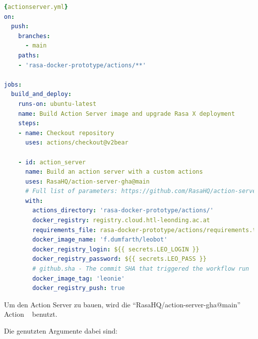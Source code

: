 \begin{lstlisting}[language=yaml,label={lst:actionserveryml},caption={action\_server.yml}]{actionserver.yml}
on:
  push:
    branches:
      - main
    paths:
    - 'rasa-docker-prototype/actions/**'

jobs:
  build_and_deploy:
    runs-on: ubuntu-latest
    name: Build Action Server image and upgrade Rasa X deployment
    steps:
    - name: Checkout repository
      uses: actions/checkout@v2bear

    - id: action_server
      name: Build an action server with a custom actions
      uses: RasaHQ/action-server-gha@main
      # Full list of parameters: https://github.com/RasaHQ/action-server-gha/tree/master#input-arguments
      with:
        actions_directory: 'rasa-docker-prototype/actions/'
        docker_registry: registry.cloud.htl-leonding.ac.at
        requirements_file: rasa-docker-prototype/actions/requirements.txt
        docker_image_name: 'f.dumfarth/leobot'
        docker_registry_login: ${{ secrets.LEO_LOGIN }}
        docker_registry_password: ${{ secrets.LEO_PASS }}
        # github.sha - The commit SHA that triggered the workflow run
        docker_image_tag: 'leonie'
        docker_registry_push: true
\end{lstlisting}

Um den Action Server zu bauen, wird die ``RasaHQ/action-server-gha@main'' Action ~\cite{actionServerAction} benutzt.

Die genutzten Argumente dabei sind:



